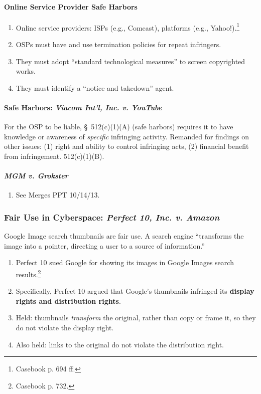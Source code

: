 \paragraph{Online Service Provider Safe Harbors}

\begin{enumerate}
    \item Online service providers: ISPs (e.g., Comcast), platforms (e.g., 
    Yahoo!).\footnote{Casebook p. 694 ff.}
    \item OSPs must have and use termination policies for repeat infringers.
    \item They must adopt ``standard technological measures'' to screen 
    copyrighted works.
    \item They must identify a ``notice and takedown'' agent.
\end{enumerate}

\paragraph{Safe Harbors: \emph{Viacom Int'l, Inc. v. YouTube}}

For the OSP to be liable, \S\ 512(c)(1)(A) (safe harbors) requires it to have 
knowledge or awareness of \emph{specific} infringing activity. Remanded for 
findings on other issues: (1) right and ability to control infringing acts, 
(2) financial benefit from infringement. 512(c)(1)(B).

\paragraph{\emph{MGM v. Grokster}}

\begin{enumerate}
    \item See Merges PPT 10/14/13.
\end{enumerate}

\subsubsection{Fair Use in Cyberspace: \emph{Perfect 10, Inc. v. Amazon}}

Google Image search thumbnails are fair use. A search engine ``transforms the 
image into a pointer, directing a user to a source of information.''

\begin{enumerate}
    \item Perfect 10 sued Google for showing its images in Google Images 
    search results.\footnote{Casebook p. 732.}
    \item Specifically, Perfect 10 argued that Google's thumbnails infringed 
    its \textbf{display rights and distribution rights}.
    \item Held: thumbnails \emph{transform} the original, rather than copy or 
    frame it, so they do not violate the display right.
    \item Also held: links to the original do not violate the distribution 
    right.
\end{enumerate}

